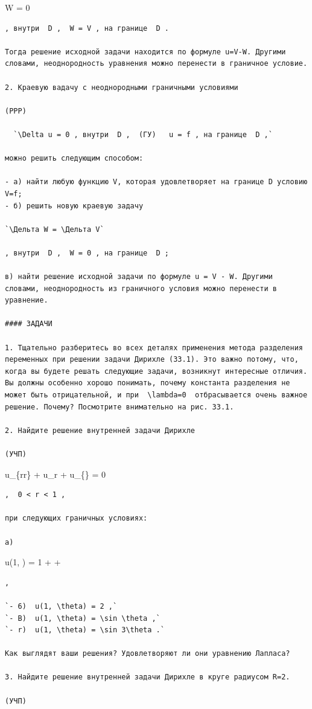 \documentclass[
  ukrainian,
]{article}
\begin{document}
\Delta W = 0

\begin{verbatim}
, внутри  D ,  W = V , на границе  D .

Тогда решение исходной задачи находится по формуле u=V-W. Другими словами, неоднородность уравнения можно перенести в граничное условие.

2. Краевую вадачу с неоднородными граничными условиями

(PPP)

  `\Delta u = 0 , внутри  D ,  (ГУ)   u = f , на границе  D ,`

можно решить следующим способом:

- а) найти любую функцию V, которая удовлетворяет на границе D условию V=f;
- б) решить новую краевую задачу

`\Дельта W = \Дельта V`

, внутри  D ,  W = 0 , на границе  D ;

в) найти решение исходной задачи по формуле u = V - W. Другими словами, неоднородность из граничного условия можно перенести в уравнение.

#### ЗАДАЧИ

1. Тщательно разберитесь во всех деталях применения метода разделения переменных при решении задачи Дирихле (33.1). Это важно потому, что, когда вы будете решать следующие задачи, возникнут интересные отличия. Вы должны особенно хорошо понимать, почему константа разделения не может быть отрицательной, и при  \lambda=0  отбрасывается очень важное решение. Почему? Посмотрите внимательно на рис. 33.1.

2. Найдите решение внутренней задачи Дирихле

(УЧП)
\end{verbatim}

u\_\{rr\} +  u\_r +  u\_\{\theta\theta\} = 0

\begin{verbatim}
,  0 < r < 1 ,

при следующих граничных условиях:

a)
\end{verbatim}

u(1, \theta) = 1 + \sin \theta +  \cos \theta

\begin{verbatim}
,

`- 6)  u(1, \theta) = 2 ,`
`- B)  u(1, \theta) = \sin \theta ,`
`- r)  u(1, \theta) = \sin 3\theta .`

Как выглядят ваши решения? Удовлетворяют ли они уравнению Лапласа?

3. Найдите решение внутренней задачи Дирихле в круге радиусом R=2.

(УЧП)
\end{verbatim}
\end{document}
